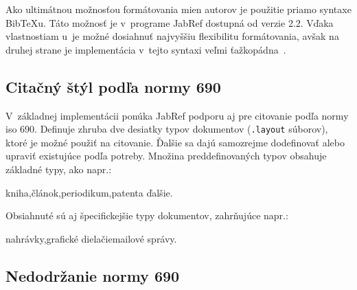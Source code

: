 \documentclass[
  color,
  table,
  nolof,
  oneside,
]{fithesis3}
\begin{document}
Ako ultimátnou možnosťou formátovania mien autorov je použitie priamo syntaxe BibTeXu. Táto možnosť je v~programe JabRef dostupná od verzie 2.2. Vďaka vlastnostiam \BibTeX u~je možné dosiahnuť najvyššiu flexibilitu formátovania, avšak na druhej strane je implementácia v~tejto syntaxi veľmi ťažkopádna~\cite{JabRefCustomExportFilters}.

\subsection{Citačný štýl podľa normy  690}

V~základnej implementácii ponúka JabRef podporu aj pre citovanie podľa normy \gls{iso} 690. Definuje zhruba dve desiatky typov dokumentov (\texttt{.layout} súborov), ktoré je možné použiť na citovanie. Ďalšie sa dajú samozrejme dodefinovať alebo upraviť existujúce podľa potreby. Množina preddefinovaných typov obsahuje základné typy, ako napr.:

\begin{center}
kniha,\enspace článok,\enspace periodikum,\enspace patent\enspace a ďalšie.
\end{center}

\noindent Obsiahnuté sú aj špecifickejšie typy dokumentov, zahrňujúce napr.:

\begin{center}
nahrávky,\enspace grafické diela\enspace či\enspace emailové správy.
\end{center}

\subsection{Nedodržanie normy  690}


\end{document}
